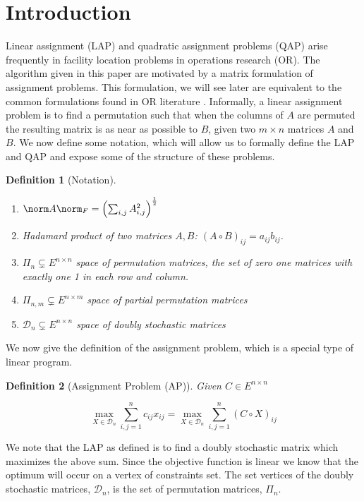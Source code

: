 \documentclass{amsart}
\theoremstyle{plain} \newtheorem{Exa}{Example}[section]
\newtheorem{Def}{Definition}[section]
\begin{document}
\section{Introduction}
Linear assignment (LAP) and quadratic
assignment problems (QAP) arise frequently in facility location
problems in operations research (OR).  The algorithm given in
this paper are motivated by a matrix formulation of assignment
problems.  This formulation, we will see later are equivalent to
the common formulations found in OR literature \cite{Pard:Book}.
Informally, a linear assignment problem is to find a permutation
such that when the columns of $A$ are permuted the resulting
matrix is as near as possible to $B$, given two $m\times n$
matrices $A$ and $B.$   We now define some notation, which will allow us
to formally define the  LAP and QAP and expose some of the
structure of these problems.
\begin{Def} [Notation] \hskip 4in
\begin{enumerate}
\item $\norm A \norm_F = \left( \sum_{i,j} A_{i,j}^2 \right)^{\frac{1}{2}}$
\item Hadamard product of two matrices $A,B$:
$(A \circ B)_{ij} = a_{ij} b_{ij}$.
\item $\Pi_n \subsetneq E^{n \times n}$ space of permutation matrices,
the set of zero one matrices with exactly one 1 in each row and column.
\item $\Pi_{n,m} \subsetneq E^{n \times m}$ space of partial permutation matrices
\item $\mathcal D_n \subsetneq E^{n \times n}$ space of doubly stochastic matrices
\end{enumerate}
\end{Def}

We now give the definition of the assignment problem, which is a special
type of linear program.
\begin{Def} [Assignment Problem (AP)]
Given $C \in E^{n \times n}$

$$
\max_{X \in \mathcal D_n} \sum_{i,j=1}^n c_{ij} x_{ij}
=
\max_{X \in \mathcal D_n} \sum_{i,j=1}^n (C \circ X)_{ij}
$$
\end{Def}

We note that the LAP as defined is to find a doubly stochastic matrix
which maximizes the above sum.  Since the objective function is
linear we know that the optimum will occur on a vertex of constraints
set.  The set vertices of the doubly stochastic matrices, $\mathcal D_n$, is
the set of permutation matrices, $\Pi_n.$
\end{document}

